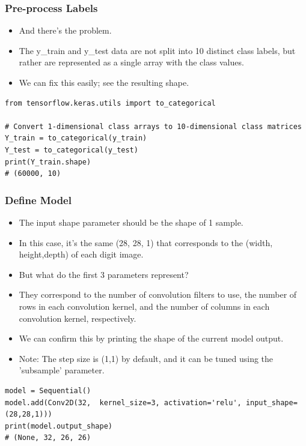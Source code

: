 \begin{frame}[fragile] \frametitle{Pre-process Labels}

\begin{itemize}
\item And there's the problem.
\item The y\_train and y\_test data are not split into 10 distinct class labels, but rather are represented as a single array with the class values.
\item We can fix this easily; see the resulting shape.
\end{itemize}
\begin{lstlisting}
from tensorflow.keras.utils import to_categorical

# Convert 1-dimensional class arrays to 10-dimensional class matrices
Y_train = to_categorical(y_train)
Y_test = to_categorical(y_test)
print(Y_train.shape)
# (60000, 10)
\end{lstlisting}
\end{frame}


\begin{frame}[fragile] \frametitle{Define Model}

\begin{itemize}
\item The input shape parameter should be the shape of 1 sample. 
\item In this case, it's the same (28, 28, 1) that corresponds to  the (width, height,depth) of each digit image.
\item But what do the first 3 parameters represent? 
\item They correspond to the number of convolution filters to use, the number of rows in each convolution kernel, and the number of columns in each convolution kernel, respectively.
\item We can confirm this by printing the shape of the current model output.
\item Note: The step size is (1,1) by default, and it can be tuned using the 'subsample' parameter.
\end{itemize}
\begin{lstlisting}
model = Sequential()
model.add(Conv2D(32,  kernel_size=3, activation='relu', input_shape=(28,28,1)))
print(model.output_shape)
# (None, 32, 26, 26)
\end{lstlisting}
\end{frame}



